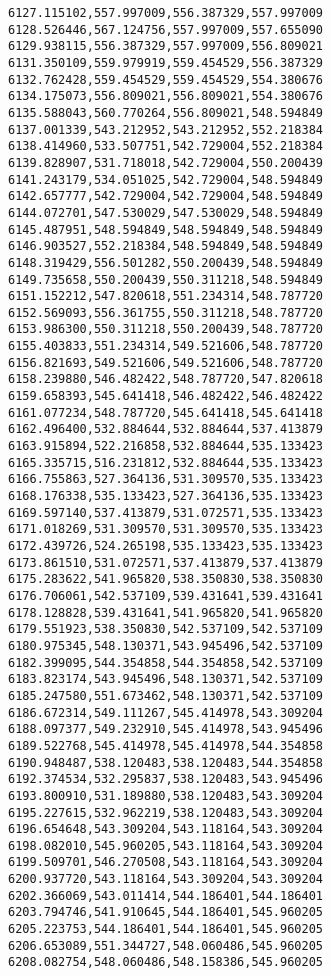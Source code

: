 \documentclass[11pt]{article}
\begin{document}
\begin{Verbatim}[commandchars=\\\{\}]
6127.115102,557.997009,556.387329,557.997009
6128.526446,567.124756,557.997009,557.655090
6129.938115,556.387329,557.997009,556.809021
6131.350109,559.979919,559.454529,556.387329
6132.762428,559.454529,559.454529,554.380676
6134.175073,556.809021,556.809021,554.380676
6135.588043,560.770264,556.809021,548.594849
6137.001339,543.212952,543.212952,552.218384
6138.414960,533.507751,542.729004,552.218384
6139.828907,531.718018,542.729004,550.200439
6141.243179,534.051025,542.729004,548.594849
6142.657777,542.729004,542.729004,548.594849
6144.072701,547.530029,547.530029,548.594849
6145.487951,548.594849,548.594849,548.594849
6146.903527,552.218384,548.594849,548.594849
6148.319429,556.501282,550.200439,548.594849
6149.735658,550.200439,550.311218,548.594849
6151.152212,547.820618,551.234314,548.787720
6152.569093,556.361755,550.311218,548.787720
6153.986300,550.311218,550.200439,548.787720
6155.403833,551.234314,549.521606,548.787720
6156.821693,549.521606,549.521606,548.787720
6158.239880,546.482422,548.787720,547.820618
6159.658393,545.641418,546.482422,546.482422
6161.077234,548.787720,545.641418,545.641418
6162.496400,532.884644,532.884644,537.413879
6163.915894,522.216858,532.884644,535.133423
6165.335715,516.231812,532.884644,535.133423
6166.755863,527.364136,531.309570,535.133423
6168.176338,535.133423,527.364136,535.133423
6169.597140,537.413879,531.072571,535.133423
6171.018269,531.309570,531.309570,535.133423
6172.439726,524.265198,535.133423,535.133423
6173.861510,531.072571,537.413879,537.413879
6175.283622,541.965820,538.350830,538.350830
6176.706061,542.537109,539.431641,539.431641
6178.128828,539.431641,541.965820,541.965820
6179.551923,538.350830,542.537109,542.537109
6180.975345,548.130371,543.945496,542.537109
6182.399095,544.354858,544.354858,542.537109
6183.823174,543.945496,548.130371,542.537109
6185.247580,551.673462,548.130371,542.537109
6186.672314,549.111267,545.414978,543.309204
6188.097377,549.232910,545.414978,543.945496
6189.522768,545.414978,545.414978,544.354858
6190.948487,538.120483,538.120483,544.354858
6192.374534,532.295837,538.120483,543.945496
6193.800910,531.189880,538.120483,543.309204
6195.227615,532.962219,538.120483,543.309204
6196.654648,543.309204,543.118164,543.309204
6198.082010,545.960205,543.118164,543.309204
6199.509701,546.270508,543.118164,543.309204
6200.937720,543.118164,543.309204,543.309204
6202.366069,543.011414,544.186401,544.186401
6203.794746,541.910645,544.186401,545.960205
6205.223753,544.186401,544.186401,545.960205
6206.653089,551.344727,548.060486,545.960205
6208.082754,548.060486,548.158386,545.960205

\end{Verbatim}
\end{document}
